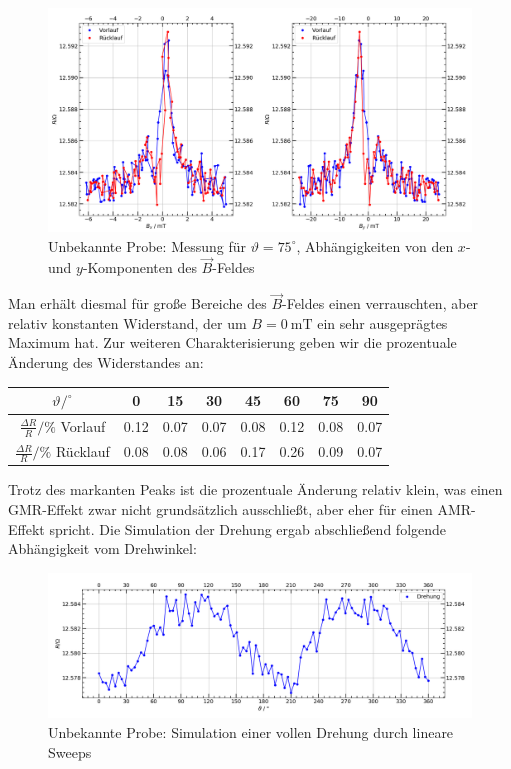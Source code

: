 \documentclass[german,  %
parskip=full,  %
]{scrartcl}
\begin{document}
\newpage
\begin{figure}[h!]\centering
\includegraphics[width=\textwidth]{Probe3_75_Grad.png}
\caption{Unbekannte Probe: Messung für \(\vartheta=75^{\circ}\), Abhängigkeiten von den \(x\)- und \(y\)-Komponenten des \(\vec{B}\)-Feldes}
\end{figure}  
Man erhält diesmal für große Bereiche des \(\vec{B}\)-Feldes einen verrauschten, aber relativ konstanten Widerstand, der um \(B = 0 \ \mathrm{mT}\) ein sehr ausgeprägtes Maximum hat. Zur weiteren Charakterisierung geben wir die prozentuale Änderung des Widerstandes an:
\begin{table}[h!]\centering
\begin{tabular}{|c|c|c|c|c|c|c|c|}
\hline
\(\vartheta / ^{\circ}\) & 0 & 15 & 30 & 45 & 60 & 75 & 90 \\\hline
\(\frac{\Delta R}{R} / \% \) Vorlauf & 0.12 & 0.07 & 0.07 & 0.08 & 0.12 & 0.08 & 0.07 \\\hline
\(\frac{\Delta R}{R} / \% \) Rücklauf & 0.08 & 0.08 & 0.06 & 0.17 & 0.26 & 0.09 & 0.07 \\\hline
\end{tabular}
\end{table}
Trotz des markanten Peaks ist die prozentuale Änderung relativ klein, was einen GMR-Effekt zwar nicht grundsätzlich ausschließt, aber eher für einen AMR-Effekt spricht. Die Simulation der Drehung ergab abschließend folgende Abhängigkeit vom Drehwinkel: 
\newpage
\begin{figure}[h!]\centering
\includegraphics[width=\textwidth]{Probe3_Drehung.png}
\caption{Unbekannte Probe: Simulation einer vollen Drehung durch lineare Sweeps}
\end{figure} 
\end{document}
